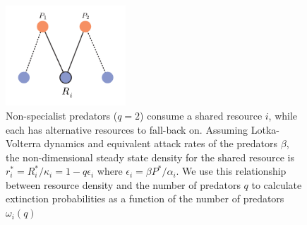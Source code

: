 \documentclass[twocolumn,preprintnumbers,amsmath,amssymb,superscriptaddress]{revtex4}
\begin{document}
\begin{figure}
\centering
\includegraphics[width=0.4\textwidth]{predpreymotif.pdf}
\caption{
Non-specialist predators ($q=2$) consume a shared resource $i$, while each has alternative resources to fall-back on. Assuming Lotka-Volterra dynamics and equivalent attack rates of the predators $\beta$, the non-dimensional steady state density for the shared resource is $r_i^* = R_i^*/\kappa_i=1 - q\epsilon_i$ where $\epsilon_i=\beta P^*/\alpha_i$. We use this relationship between resource density and the number of predators $q$ to calculate extinction probabilities as a function of the number of predators $\omega_i(q)$
}
\label{fig:lv}
\end{figure} 
\end{document}
